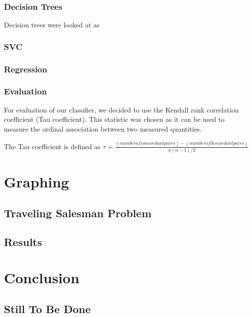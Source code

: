 \documentclass[12pt]{report}
\begin{document}
\subsection{Decision Trees}
Decision trees were looked at as %
\subsection{SVC}
\subsection{Regression}
\subsection{Evaluation}
For evaluation of our classifier, we decided to use the Kendall rank correlation coefficient (Tau coefficient).
This statistic was chosen as it can be used to measure the ordinal association between two measured quantities.

The Tau coefficient is defined as $\tau = \frac{(number of concordant pairs) - (number of discordant pairs)}{n(n-1)/2}$
\cite{}%



\chapter{Graphing}
\section{Traveling Salesman Problem}

\section{Results}

\chapter{Conclusion}
\section{Still To Be Done}

{}
\end{document}
